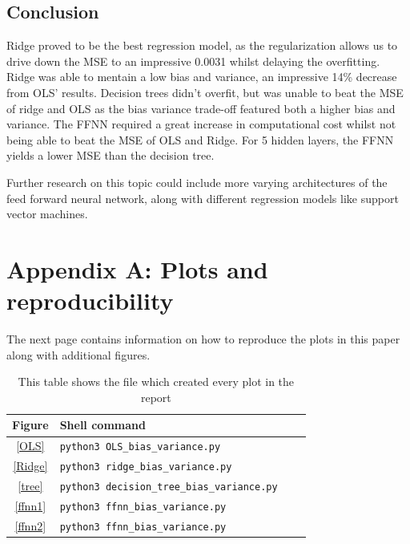 \documentclass[onecolumn,10pt,cleanfoot]{asme2ej}
\begin{document}
\subsection{Conclusion}
Ridge proved to be the best regression model, as the regularization allows us to drive down the MSE to an impressive 0.0031 whilst delaying the overfitting. Ridge was able to mentain a low bias and variance, an impressive 14\% decrease from OLS' results. Decision trees didn't overfit, but was unable to beat the MSE of ridge and OLS as the bias variance trade-off featured both a higher bias and variance. The FFNN required a great increase in computational cost whilst not being able to beat the MSE of OLS and Ridge. For 5 hidden layers, the FFNN yields a lower MSE than the decision tree.

Further research on this topic could include more varying architectures of the feed forward neural network, along with different regression models like support vector machines.




\section*{Appendix A: Plots and reproducibility}

The next page contains information on how to reproduce the plots in this paper along with additional figures.

\begin{table}[h]
\caption{This table shows the file which created every plot in the report}
\begin{center}
\label{allparamstable}
\begin{tabular}{c | l l l}
Figure & Shell command \\
\hline
\ref{OLS} & \texttt{python3 OLS\_bias\_variance.py}\\
\ref{Ridge} & \texttt{python3 ridge\_bias\_variance.py}\\
\ref{tree} & \texttt{python3 decision\_tree\_bias\_variance.py}\\
\ref{ffnn1} & \texttt{python3 ffnn\_bias\_variance.py}\\
\ref{ffnn2} & \texttt{python3 ffnn\_bias\_variance.py}\\
\hline
\end{tabular}
\end{center}
\end{table}
\end{document}
